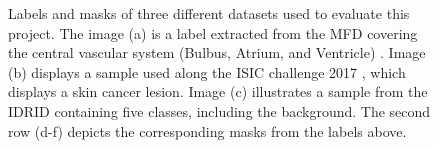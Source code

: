 \begin{figure}[H]
  \caption[Dataset samples and output label]{Labels and masks of three different datasets used to evaluate this project. The image (a) is a label extracted from the \acf{MFD} covering the central vascular system (Bulbus, Atrium, and Ventricle) \cite{10.1371/journal.pone.0263656}. Image (b) displays a sample used along the \acf{ISIC} challenge 2017 \cite{DBLP:journals/corr/abs-1710-05006}, which displays a skin cancer lesion. Image (c) illustrates a sample from the \acf{IDRID}\cite{h25w9818} containing five classes, including the background. The second row (d-f) depicts the corresponding masks from the labels above.}
  \label{dataset_labels}
\end{figure}
